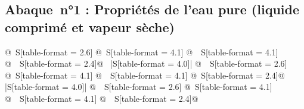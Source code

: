 

\begin{center}
\begin{footnotesize}
\subsection*{Abaque~n°1 : Propriétés de l’eau pure (liquide comprimé et vapeur sèche)}
\begin{longtable}[c]{%
@{~}S[table-format = 2.6]%
@{~}S[table-format = 4.1]%
@{~~}S[table-format = 4.1]%
@{~~}S[table-format = 2.4]@{~}%
|S[table-format = 4.0]|%
@{~~}S[table-format = 2.6]%
@{~}S[table-format = 4.1]%
@{~~}S[table-format = 4.1]%
@{~}S[table-format = 2.4]@{~}%
|S[table-format = 4.0]|%
@{~~}S[table-format = 2.6]%
@{~}S[table-format = 4.1]%
@{~~}S[table-format = 4.1]%
@{~~}S[table-format = 2.4]@{~}%
}


\end{longtable}
\end{footnotesize}
\end{center}
